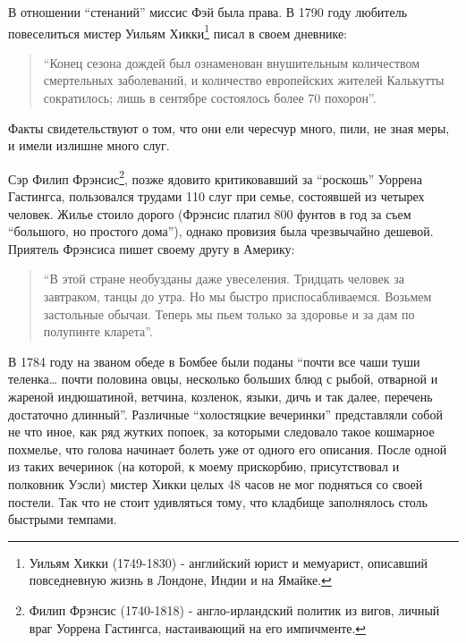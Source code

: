 \documentclass[
  oneside,
  12pt,
  titlepage]{book}
\begin{document}
В отношении ``стенаний'' миссис Фэй была права. В 1790 году любитель повеселиться мистер Уильям Хикки\footnote{Уильям Хикки (1749-1830) - английский юрист и мемуарист, описавший повседневную жизнь в Лондоне, Индии и на Ямайке.} писал в своем дневнике:

\begin{quote}
``Конец сезона дождей был ознаменован внушительным количеством смертельных заболеваний, и количество европейских жителей Калькутты сократилось; лишь в сентябре состоялось более 70 похорон''.
\end{quote}

Факты свидетельствуют о том, что они ели чересчур много, пили, не зная меры, и имели излишне много слуг.

Сэр Филип Фрэнсис\footnote{Филип Фрэнсис (1740-1818) - англо-ирландский политик из вигов, личный враг Уоррена Гастингса, настаивающий на его импичменте.}, позже ядовито критиковавший за ``роскошь'' Уоррена Гастингса, пользовался трудами 110 слуг при семье, состоявшей из четырех человек. Жилье стоило дорого (Фрэнсис платил 800 фунтов в год за съем ``большого, но простого дома''), однако провизия была чрезвычайно дешевой. Приятель Фрэнсиса пишет своему другу в Америку:

\begin{quote}
``В этой стране необузданы даже увеселения. Тридцать человек за завтраком, танцы до утра. Но мы быстро приспосабливаемся. Возьмем застольные обычаи. Теперь мы пьем только за здоровье и за дам по полупинте кларета''.
\end{quote}

В 1784 году на званом обеде в Бомбее были поданы ``почти все чаши туши теленка\ldots{} почти половина овцы, несколько больших блюд с рыбой, отварной и жареной индюшатиной, ветчина, козленок, языки, дичь и так далее, перечень достаточно длинный''. Различные ``холостяцкие вечеринки'' представляли собой не что иное, как ряд жутких попоек, за которыми следовало такое кошмарное похмелье, что голова начинает болеть уже от одного его описания. После одной из таких вечеринок (на которой, к моему прискорбию, присутствовал и полковник Уэсли) мистер Хикки целых 48 часов не мог подняться со своей постели. Так что не стоит удивляться тому, что кладбище заполнялось столь быстрыми темпами.
\end{document}
